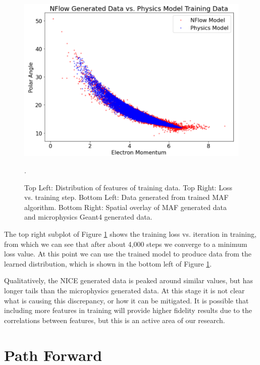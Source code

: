 \begin{figure}[!ht]
\begin{minipage}{0.5\textwidth}
        \includegraphics[width=1\textwidth,trim={0 0 0 0},clip]{pictures/nflow_vs_gemc.png}
    \end{minipage}
    \caption{Top Left: Distribution of features of training data. Top Right: Loss vs. training step. Bottom Left: Data generated from trained MAF algorithm. Bottom Right: Spatial overlay of MAF generated data and microphysics Geant4 generated data.}
    \label{fig:a}.
\end{figure}

The top right subplot of Figure \ref{fig:a} shows the training loss vs. iteration in training, from which we can see that after about 4,000 steps we converge to a minimum loss value. At this point we can use the trained model to produce data from the learned distribution, which is shown in the bottom left of Figure \ref{fig:a}.

Qualitatively, the NICE generated data is peaked around similar values, but has longer tails than the microphysics generated data. At this stage it is not clear what is causing this discrepancy, or how it can be mitigated. It is possible that including more features in training will provide higher fidelity results due to the correlations between features, but this is an active area of our research.


\section{Path Forward}

